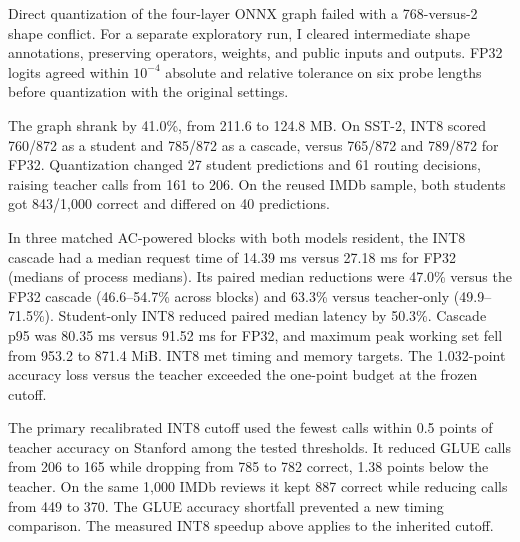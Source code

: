 Direct quantization of the four-layer ONNX graph failed with a 768-versus-2 shape conflict. For a separate exploratory run, I cleared intermediate shape annotations, preserving operators, weights, and public inputs and outputs. FP32 logits agreed within \(10^{-4}\) absolute and relative tolerance on six probe lengths before quantization with the original settings.

The graph shrank by 41.0\%, from 211.6 to 124.8 MB. On SST-2, INT8 scored 760/872 as a student and 785/872 as a cascade, versus 765/872 and 789/872 for FP32. Quantization changed 27 student predictions and 61 routing decisions, raising teacher calls from 161 to 206. On the reused IMDb sample, both students got 843/1,000 correct and differed on 40 predictions.

In three matched AC-powered blocks with both models resident, the INT8 cascade had a median request time of 14.39 ms versus 27.18 ms for FP32 (medians of process medians). Its paired median reductions were 47.0\% versus the FP32 cascade (46.6--54.7\% across blocks) and 63.3\% versus teacher-only (49.9--71.5\%). Student-only INT8 reduced paired median latency by 50.3\%. Cascade p95 was 80.35 ms versus 91.52 ms for FP32, and maximum peak working set fell from 953.2 to 871.4 MiB. INT8 met timing and memory targets. The 1.032-point accuracy loss versus the teacher exceeded the one-point budget at the frozen cutoff.

The primary recalibrated INT8 cutoff used the fewest calls within 0.5 points of teacher accuracy on Stanford among the tested thresholds. It reduced GLUE calls from 206 to 165 while dropping from 785 to 782 correct, 1.38 points below the teacher. On the same 1,000 IMDb reviews it kept 887 correct while reducing calls from 449 to 370. The GLUE accuracy shortfall prevented a new timing comparison. The measured INT8 speedup above applies to the inherited cutoff.
